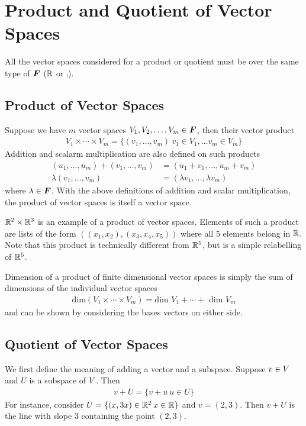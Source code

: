 \documentclass[../../linear_algebra.tex]{subfiles}
\begin{document}
\section{Product and Quotient of Vector Spaces}
All the vector spaces considered for a product or quotient must be over the same type of $\bm{F}$ ($\mathbb{R}$ or $\comp$).\newline


\subsection{Product of Vector Spaces}
Suppose we have $m$ vector spaces $V_{1}, V_{2}, \ldots, V_{m} \in \bm{F}$, then their vector product
\begin{align*}
    V_{1}\times \cdots \times V_{m} = \{ (v_{1}, \ldots, v_{m}) \: v_{1}\in V_{1}, \ldots v_{m} \in V_{m} \}
\end{align*}
Addition and scalarm multiplication are also defined on such products
\begin{align*}
    (u_{1}, \ldots, u_{m}) + (v_{1}, \ldots, v_{m}) &= (u_{1} + v_{1}, \ldots, u_{m} + v_{m})\\
    \lambda (v_{1}, \ldots, v_{m}) &= (\lambda v_{1}, \ldots, \lambda v_{m})
\end{align*}
where $\lambda \in \bm{F}$. With the above definitions of addition and scalar multiplication, the product of vector spaces is itself a vector space.\newline

$\mathbb{R}^{2} \times \mathbb{R}^{3}$ is an example of a product of vector spaces. Elements of such a product are lists of the form $((x_{1}, x_{2}), (x_{3}, x_{4}, x_{5}))$ where all 5 elements belong in $\mathbb{R}$. Note that this product is technically different from $\mathbb{R}^{5}$, but is a simple relabelling of $\mathbb{R}^{5}$.\newline

Dimension of a product of finite dimensional vector spaces is simply the sum of dimensions of the individual vector spaces
\begin{align*}
    \text{dim}(V_{1} \times \cdots \times V_{m}) = \text{dim }V_{1} + \cdots + \text{ dim }V_{m}
\end{align*}
and can be shown by considering the bases vectors on either side.


\subsection{Quotient of Vector Spaces}
We first define the meaning of adding a vector and a subspace. Suppose $v \in V$ and $U$ is a subspace of $V$. Then
\begin{align*}
    v + U = \{ v + u \: u \in U \}
\end{align*}
For instance, consider $U = \{(x, 3x) \in \mathbb{R}^{2} \: x \in \mathbb{R} \}$ and $v = (2,3)$. Then $v + U$ is the line with slope $3$ containing the point $(2,3)$.\newline
\end{document}
